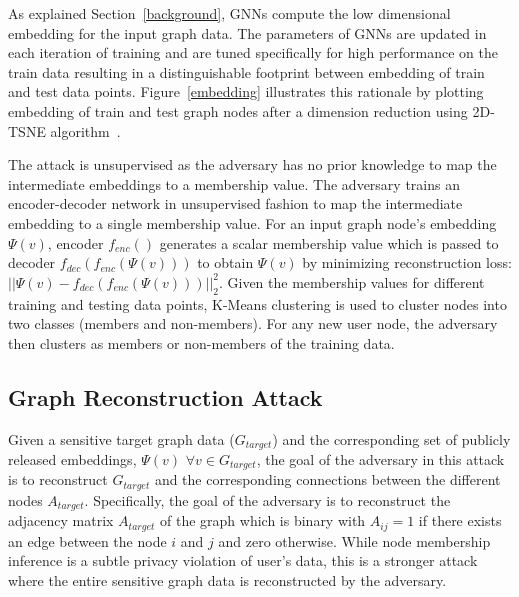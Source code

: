 As explained Section~\ref{background}, GNNs compute the low dimensional embedding for the input graph data.
The parameters of GNNs are updated in each iteration of training and are tuned specifically for high performance on the train data resulting in a distinguishable footprint between embedding of train and test data points.
Figure~\ref{embedding} illustrates this rationale by plotting embedding of train and test graph nodes after a dimension reduction using 2D-TSNE algorithm~\cite{tsne}.


The attack is unsupervised as the adversary has no prior knowledge to map the intermediate embeddings to a membership value. %
The adversary trains an encoder-decoder network in unsupervised fashion to map the intermediate embedding to a single membership value.
For an input graph node's embedding $\Psi (v)$, encoder $f_{enc}()$ generates a scalar membership value which is passed to decoder $f_{dec}(f_{enc}(\Psi (v)))$ to obtain $\Psi(v)$ by minimizing reconstruction loss: $||\Psi (v) - f_{dec}(f_{enc}(\Psi (v)))||_2^2$.
Given the membership values for different training and testing data points, K-Means clustering is used to cluster nodes into two classes (members and non-members).
For any new user node, the adversary then clusters as members or non-members of the training data.







\subsection{Graph Reconstruction Attack}

Given a sensitive target graph data ($G_{target}$) and the corresponding set of publicly released embeddings, $\Psi (v)$ $\forall v \in G_{target}$, the goal of the adversary in this attack is to reconstruct $G_{target}$ and the corresponding connections between the different nodes $A_{target}$.
Specifically, the goal of the adversary is to reconstruct the adjacency matrix $A_{target}$ of the graph which is binary with $A_{ij}=1$ if there exists an edge between the node $i$ and $j$ and zero otherwise.
While node membership inference is a subtle privacy violation of user's data, this is a stronger attack where the entire sensitive graph data is reconstructed by the adversary.

